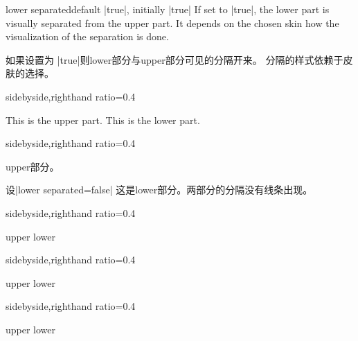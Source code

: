 \begin{docTcbKey}{lower separated}{}{default |true|, initially |true|}
If set to |true|, the lower part is visually separated from the upper part.
It depends on the chosen skin how the visualization of the separation is done.

如果设置为 |true|则lower部分与upper部分可见的分隔开来。
分隔的样式依赖于皮肤的选择。




\begin{dispExample*}{sidebyside,righthand ratio=0.4}
\begin{tcolorbox}[title=Lower separated]
This is the upper part.
\tcblower
This is the lower part.
\end{tcolorbox}
\end{dispExample*}


\begin{dispExample*}{sidebyside,righthand ratio=0.4}
\begin{tcolorbox}[title=Lower not separated,%
lower separated=false]
upper部分。

设|lower separated=false|
\tcblower
这是lower部分。两部分的分隔没有线条出现。
\end{tcolorbox}    
\end{dispExample*}

\begin{dispExample*}{sidebyside,righthand ratio=0.4}
\begin{tcolorbox}[sidebyside,title={sidebyside}]
upper
\tcblower
lower
\end{tcolorbox}
\end{dispExample*}

\begin{dispExample*}{sidebyside,righthand ratio=0.4}
\begin{tcolorbox}[sidebyside,title={sidebyside}%
,lower separated=false]
upper
\tcblower
lower
\end{tcolorbox}
\end{dispExample*}

\begin{dispExample*}{sidebyside,righthand ratio=0.4}
\begin{tcolorbox}[beamer,title=Lower separated]
upper
\tcblower
lower
\end{tcolorbox}
\end{dispExample*}


\end{docTcbKey}
